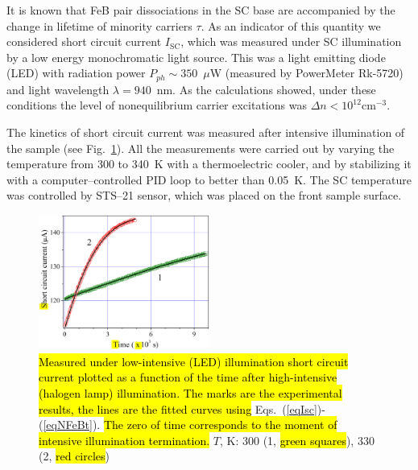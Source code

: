\documentclass[sn-mathphys]{sn-jnl}%
\theoremstyle{thmstyleone}%
\theoremstyle{thmstyletwo}%
\theoremstyle{thmstylethree}%
\begin{document}
It is known that FeB pair dissociations in the SC base are accompanied by the change
in lifetime of minority carriers $\tau$.
As an indicator of this quantity we considered short circuit current $I_\mathrm{SC}$,
which was measured under SC illumination by a low energy monochromatic light source.
This was a light emitting diode (LED) with radiation power $P_{ph}\sim350$~$\mu$W
(measured by PowerMeter Rk-5720) and light wavelength $\lambda=940$~nm.
As the calculations showed, under these conditions the level of nonequilibrium carrier
excitations was $\Delta n<10^{12}$cm$^{-3}$.

The kinetics of short circuit current was measured after intensive illumination of the sample
(see Fig.~\ref{figIsc}).
All the measurements were carried out by varying the temperature from 300 to 340~K with a thermoelectric cooler,
and by stabilizing it with a computer--controlled PID loop to better than 0.05~K.
The SC temperature was controlled by STS--21 sensor, which was placed on the front sample surface.

\begin{figure}
\centering
\includegraphics[width=0.5\textwidth]{Fig2}
\caption{
\hl{Measured under low-intensive (LED) illumination short circuit current
 plotted as a function of the time after high-intensive (halogen lamp) illumination.
The marks are the experimental results, the lines are the fitted curves using} Eqs.~(\ref{eqIsc})-(\ref{eqNFeBt}).
\hl{The zero of time corresponds to the moment of intensive illumination termination.}
$T$, K: 300 (1, \hl{ green squares}), 330 (2, \hl{red circles})}
\label{figIsc}       %
\end{figure}
\end{document}
